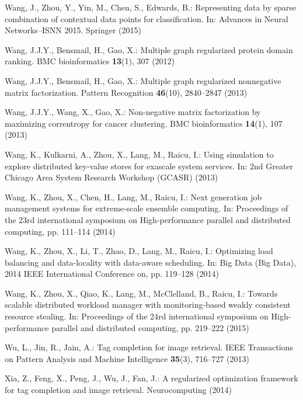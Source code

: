 \documentclass[runningheads,a4paper]{llncs}
\begin{document}
\begin{thebibliography}{10}
Wang, J., Zhou, Y., Yin, M., Chen, S., Edwards, B.: Representing data by sparse
  combination of contextual data points for classification.
\newblock In: Advances in Neural Networks--ISNN 2015. Springer (2015)

Wang, J.J.Y., Bensmail, H., Gao, X.: Multiple graph regularized protein domain
  ranking.
\newblock BMC bioinformatics \textbf{13}(1), 307 (2012)

Wang, J.J.Y., Bensmail, H., Gao, X.: Multiple graph regularized nonnegative
  matrix factorization.
\newblock Pattern Recognition \textbf{46}(10), 2840--2847 (2013)

Wang, J.J.Y., Wang, X., Gao, X.: Non-negative matrix factorization by
  maximizing correntropy for cancer clustering.
\newblock BMC bioinformatics \textbf{14}(1), 107 (2013)

Wang, K., Kulkarni, A., Zhou, X., Lang, M., Raicu, I.: Using simulation to
  explore distributed key-value stores for exascale system services.
\newblock In: 2nd Greater Chicago Area System Research Workshop (GCASR) (2013)

Wang, K., Zhou, X., Chen, H., Lang, M., Raicu, I.: Next generation job
  management systems for extreme-scale ensemble computing.
\newblock In: Proceedings of the 23rd international symposium on
  High-performance parallel and distributed computing, pp. 111--114 (2014)

Wang, K., Zhou, X., Li, T., Zhao, D., Lang, M., Raicu, I.: Optimizing load
  balancing and data-locality with data-aware scheduling.
\newblock In: Big Data (Big Data), 2014 IEEE International Conference on, pp.
  119--128 (2014)

Wang, K., Zhou, X., Qiao, K., Lang, M., McClelland, B., Raicu, I.: Towards
  scalable distributed workload manager with monitoring-based weakly consistent
  resource stealing.
\newblock In: Proceedings of the 24rd international symposium on
  High-performance parallel and distributed computing, pp. 219--222 (2015)

Wu, L., Jin, R., Jain, A.: Tag completion for image retrieval.
\newblock IEEE Transactions on Pattern Analysis and Machine Intelligence
  \textbf{35}(3), 716--727 (2013)

Xia, Z., Feng, X., Peng, J., Wu, J., Fan, J.: A regularized optimization
  framework for tag completion and image retrieval.
\newblock Neurocomputing  (2014)


\end{thebibliography}
\end{document}
